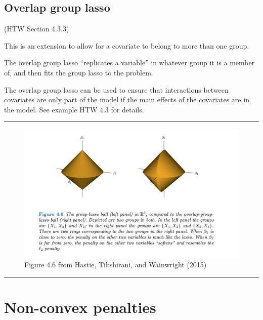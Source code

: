 \documentclass[
  letterpaper,
  DIV=11,
  numbers=noendperiod]{scrartcl}
\begin{document}
\hypertarget{overlap-group-lasso}{%
\subsection{Overlap group lasso}\label{overlap-group-lasso}}

(HTW Section 4.3.3)

This is an extension to allow for a covariate to belong to more than one
group.

The overlap group lasso ``replicates a variable'' in whatever group it
is a member of, and then fits the group lasso to the problem.

The overlap group lasso can be used to ensure that interactions between
covariates are only part of the model if the main effects of the
covariates are in the model. See example HTW 4.3 for details.

\begin{center}\rule{0.5\linewidth}{0.5pt}\end{center}

\begin{figure}

{\centering \includegraphics[width=1\textwidth,height=\textheight]{./HTWFig46.png}

}

\caption{Figure 4.6 from Hastie, Tibshirani, and Wainwright (2015)}

\end{figure}

\begin{center}\rule{0.5\linewidth}{0.5pt}\end{center}

\hypertarget{non-convex-penalties}{%
\section{Non-convex penalties}\label{non-convex-penalties}}
\end{document}
